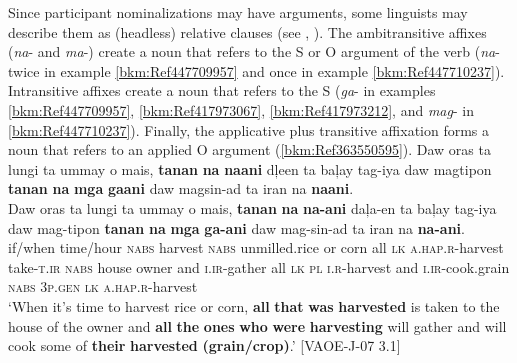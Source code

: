 Since participant nominalizations may have arguments, some linguists may describe them as (headless) relative clauses (see , ). The ambitransitive affixes (\textit{na}{}- and \textit{ma}-) create a noun that refers to the S or O argument of the verb (\textit{na}- twice in example \ref{bkm:Ref447709957} and once in example \ref{bkm:Ref447710237}). Intransitive affixes create a noun that refers to the S (\textit{ga}{}- in examples \ref{bkm:Ref447709957}, \ref{bkm:Ref417973067}, \ref{bkm:Ref417973212}, and \textit{mag}{}- in \ref{bkm:Ref447710237}). Finally, the applicative plus transitive affixation forms a noun that refers to an applied O argument (\ref{bkm:Ref363550595}).
\ea
\label{bkm:Ref447709957}
Daw  oras  ta  lungi ta  ummay  o  mais,  \textbf{tanan} \textbf{na} \textbf{naani} dļeen  ta  baļay  tag-iya  daw  magtipon  \textbf{tanan}  \textbf{na}  \textbf{mga}  \textbf{gaani} daw  magsin-ad  ta  iran  na  \textbf{naani}. \\\smallskip
 \gll Daw  oras  ta  lungi\footnotemark{}  ta  ummay  o  mais,  \textbf{tanan} \textbf{na} \textbf{na-ani} daļa-en  ta  baļay  tag-iya  daw  mag-tipon  \textbf{tanan}  \textbf{na}  \textbf{mga}  \textbf{ga-ani} daw  mag-sin-ad  ta  iran  na  \textbf{na-ani}. \\
if/when  time/hour  \textsc{nabs}  harvest  \textsc{nabs}  unmilled.rice  or  corn  all  \textsc{lk} \textsc{a.hap.r}-harvest take-\textsc{t.ir}  \textsc{nabs}  house  owner  and  \textsc{i.ir-}gather  all  \textsc{lk}  \textsc{pl} \textsc{i.r-}harvest
and  \textsc{i.ir-}cook.grain  \textsc{nabs}  3\textsc{p.gen}  \textsc{lk}  \textsc{a.hap.r}-harvest \\
\glt `When it’s time to harvest rice or corn, \textbf{all} \textbf{that} \textbf{was} \textbf{harvested} is taken to the house of the owner and \textbf{all} \textbf{the} \textbf{ones} \textbf{who} \textbf{were} \textbf{harvesting} will gather and will cook some of \textbf{their} \textbf{harvested} \textbf{(grain/crop)}.’ [VAOE-J-07 3.1]
\z

